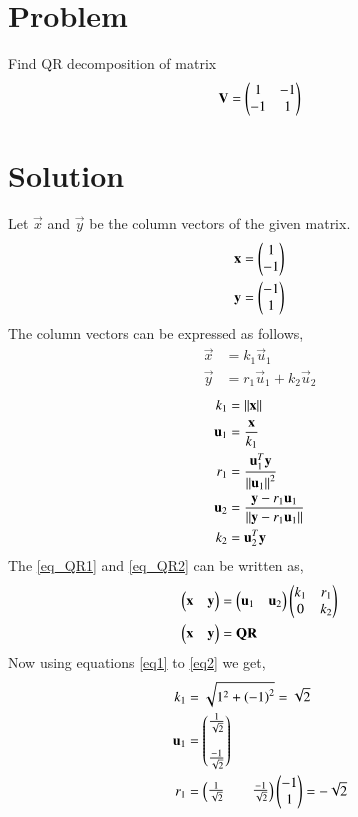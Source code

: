 \documentclass[journal,12pt,twocolumn]{IEEEtran}
\begin{document}
\section{\textbf{Problem}}
Find QR decomposition of matrix
\begin{equation}
	\mathbf{V} = \begin{pmatrix}1 & -1\\ -1 & 1\end{pmatrix}
\end{equation}
\section{\textbf{Solution}}
Let $\vec{x}$ and $\vec{y}$ be the column vectors of the given matrix.
\begin{align}
    \mathbf{x} &= \begin{pmatrix}1 \\-1 \end{pmatrix}\\
    \mathbf{y} &= \begin{pmatrix}-1 \\ 1\end{pmatrix}
\end{align}
The column vectors can be expressed as follows,
\begin{align}
    \vec{x} &= k_1\vec{u}_1\label{eq_QR1}\\
    \vec{y} &= r_1\vec{u}_1+k_2\vec{u}_2\label{eq_QR2}
\end{align}
\begin{align}
    k_1 &= \left\lVert\mathbf{x}\right\rVert\label{eq1}\\
    \mathbf{u}_1 &= \frac{\mathbf{x}}{k_1}\\
    r_1 &= \frac{\mathbf{u}_1^T\mathbf{y}}{\left\lVert\mathbf{u}_1\right\rVert^2}\\
    \mathbf{u}_2 &= \frac{\mathbf{y} - r_1 \mathbf{u}_1}{\left\lVert\mathbf{y} - r_1 \mathbf{u}_1\right\rVert} \label{eq2.8}\\
    k_2 &= {\mathbf{u}_2^T\mathbf{y}}\label{eq2}
\end{align}
The \eqref{eq_QR1} and \eqref{eq_QR2} can be written as, 
\begin{align}
\begin{pmatrix}\mathbf{x} & \mathbf{y}\end{pmatrix} &= \begin{pmatrix}\mathbf{u}_1 & \mathbf{u}_2\end{pmatrix}\begin{pmatrix}k_1 & r_1 \\ 0 & k_2\end{pmatrix}\label{QRMain}\\
\begin{pmatrix}\mathbf{x} & \mathbf{y}\end{pmatrix} &= \mathbf{Q}\mathbf{R}
\end{align}
Now using equations \eqref{eq1} to \eqref{eq2} we get, 
\begin{align}
    k_1 &= \sqrt{1^2+\left( -1\right)^2} = \sqrt{2}\label{eqval1}\\ 
    \mathbf{u}_1 &= \begin{pmatrix}\frac{1}{\sqrt{2}}\\ \\ \frac{-1}{\sqrt{2}}\end{pmatrix} \\
    r_1 &= \begin{pmatrix}\frac{1}{\sqrt{2}}&&\frac{-1}{\sqrt{2}}\end{pmatrix}\begin{pmatrix}-1 \\ 1\end{pmatrix} = -\sqrt{2}\\ 
    \end{align}
\end{document}
